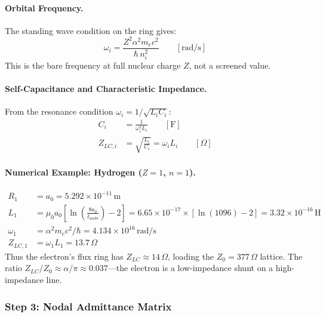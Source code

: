 \paragraph{Orbital Frequency.}
The standing wave condition on the ring gives:
\begin{equation}
    \omega_i = \frac{Z^2 \alpha^2 m_e c^2}{\hbar\, n_i^2}
    \qquad [\text{rad/s}]
    \label{eq:orbital_frequency}
\end{equation}
This is the bare frequency at full nuclear charge $Z$, not a
screened value.

\paragraph{Self-Capacitance and Characteristic Impedance.}
From the resonance condition $\omega_i = 1/\sqrt{L_i C_i}$:
\begin{align}
    C_i &= \frac{1}{\omega_i^2 L_i} \qquad [\text{F}]
    \label{eq:ring_capacitance} \\
    Z_{LC,i} &= \sqrt{\frac{L_i}{C_i}} = \omega_i L_i
    \qquad [\Omega]
    \label{eq:ring_impedance}
\end{align}

\paragraph{Numerical Example: Hydrogen ($Z=1$, $n=1$).}
\begin{align}
    R_1 &= a_0 = 5.292 \times 10^{-11}\,\text{m} \nonumber \\
    L_1 &= \mu_0 a_0 \left[\ln\!\left(\frac{8a_0}{\ell_{\text{node}}}
    \right) - 2\right]
    = 6.65 \times 10^{-17} \times [\ln(1096) - 2]
    = 3.32 \times 10^{-16}\,\text{H} \nonumber \\
    \omega_1 &= \alpha^2 m_e c^2 / \hbar
    = 4.134 \times 10^{16}\,\text{rad/s} \nonumber \\
    Z_{LC,1} &= \omega_1 L_1 = 13.7\,\Omega
    \label{eq:hydrogen_zlc}
\end{align}
Thus the electron's flux ring has $Z_{LC} \approx 14\,\Omega$,
loading the $Z_0 = 377\,\Omega$ lattice. The ratio
$Z_{LC}/Z_0 \approx \alpha/\pi \approx 0.037$---the electron
is a low-impedance shunt on a high-impedance line.

\subsubsection{Step 3: Nodal Admittance Matrix}

